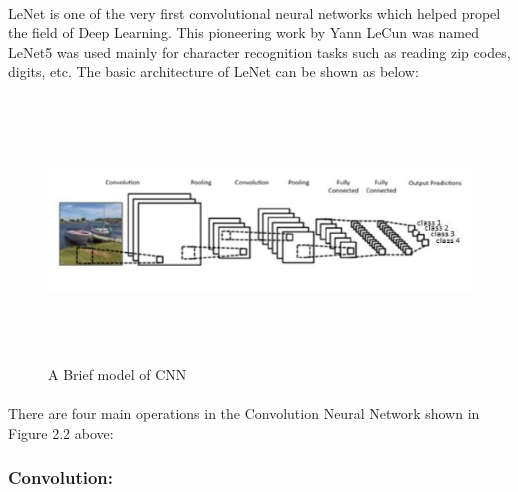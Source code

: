 \documentclass[a4paper,12pt,oneside]{article}
\begin{document}
\paragraph{}
LeNet is one of the very first convolutional neural networks which helped propel the field of Deep Learning. This pioneering work by Yann LeCun was named LeNet5 was used mainly for character recognition tasks such as reading zip codes, digits, etc. The basic architecture of LeNet can be shown as below:

\begin{figure}[H]
\centering
\includegraphics[height=7cm,width=17cm]{1.png}
\caption{A Brief model of CNN}
\end{figure}

\paragraph{}
﻿There are four main operations in the Convolution Neural Network shown in Figure 2.2 above:  

\subsubsection{Convolution:}
\end{document}
